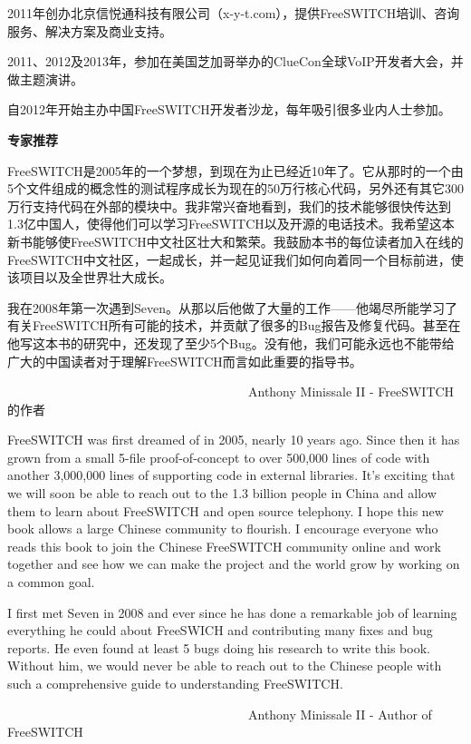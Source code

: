 \documentclass[$if(fontsize)$$fontsize$,$endif$$if(lang)$$lang$,$endif$CJKutf8,twoside,openright]{$documentclass$}
\begin{document}
\begin{CJK}{UTF8}{gbsn}
2011年创办北京信悦通科技有限公司（x-y-t.com），提供FreeSWITCH培训、咨询服务、解决方案及商业支持。

2011、2012及2013年，参加在美国芝加哥举办的ClueCon全球VoIP开发者大会，并做主题演讲。

自2012年开始主办中国FreeSWITCH开发者沙龙，每年吸引很多业内人士参加。

\newpage

{\large \bf 专家推荐}

FreeSWITCH是2005年的一个梦想，到现在为止已经近10年了。它从那时的一个由5个文件组成的概念性的测试程序成长为现在的50万行核心代码，另外还有其它300万行支持代码在外部的模块中。我非常兴奋地看到，我们的技术能够很快传达到1.3亿中国人，使得他们可以学习FreeSWITCH以及开源的电话技术。我希望这本新书能够使FreeSWITCH中文社区壮大和繁荣。我鼓励本书的每位读者加入在线的FreeSWITCH中文社区，一起成长，并一起见证我们如何向着同一个目标前进，使该项目以及全世界壮大成长。

我在2008年第一次遇到Seven。从那以后他做了大量的工作——他竭尽所能学习了有关FreeSWITCH所有可能的技术，并贡献了很多的Bug报告及修复代码。甚至在他写这本书的研究中，还发现了至少5个Bug。没有他，我们可能永远也不能带给广大的中国读者对于理解FreeSWITCH而言如此重要的指导书。

　　　　　　　　　　　　　　　　　　　Anthony Minissale II - FreeSWITCH的作者

FreeSWITCH was first dreamed of in 2005, nearly 10 years ago.  Since then it has grown from a small 5-file proof-of-concept to over 500,000 lines of code with another 3,000,000 lines of supporting code in external libraries.  It’s exciting that we will soon be able to reach out to the 1.3 billion people in China and allow them to learn about FreeSWITCH and open source telephony.   I hope this new book allows a large Chinese community to flourish.  I encourage everyone who reads this book to join the Chinese FreeSWITCH community online and work together and see how we can make the project and the world grow by working on a common goal.

I first met Seven in 2008 and ever since he has done a remarkable job of learning everything he could about FreeSWICH and contributing many fixes and bug reports.  He even found at least 5 bugs doing his research to write this book.  Without him, we would never be able to reach out to the Chinese people with such a comprehensive guide to understanding FreeSWITCH.

　　　　　　　　　　　　　　　　　　　Anthony Minissale II - Author of FreeSWITCH



\end{CJK}
\end{document}
